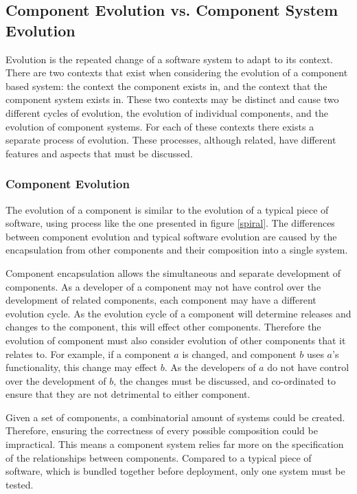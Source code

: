 \subsection{Component Evolution vs. Component System Evolution}
Evolution is the repeated change of a software system to adapt to its context.
There are two contexts that exist when considering the evolution of a component based system:
the context the component exists in, and the context that the component system exists in.
These two contexts may be distinct and cause two different cycles of evolution, the evolution of individual components, and the evolution of component systems.
For each of these contexts there exists a separate process of evolution.
These processes, although related, have different features and aspects that must be discussed.

\subsubsection{Component Evolution}
The evolution of a component is similar to the evolution of a typical piece of software, using process like the one presented in figure \ref{spiral}.
The differences between component evolution and typical software evolution are caused by the encapsulation from other components and their composition into a single system.

Component encapsulation allows the simultaneous and separate development of components.
As a developer of a component may not have control over the development of related components, each component may have a different evolution cycle.
As the evolution cycle of a component will determine releases and changes to the component, this will effect other components.
Therefore the evolution of component must also consider evolution of other components that it relates to.
For example, if a component $a$ is changed, and component $b$ uses $a$'s functionality, this change may effect $b$.
As the developers of $a$ do not have control over the development of $b$, the changes must be discussed, and co-ordinated to ensure that they are not detrimental to either component.

Given a set of components, a combinatorial amount of systems could be created.
Therefore, ensuring the correctness of every possible composition could be impractical.
This means a component system relies far more on the specification of the relationships between components.
Compared to a typical piece of software, which is bundled together before deployment, only one system must be tested.

